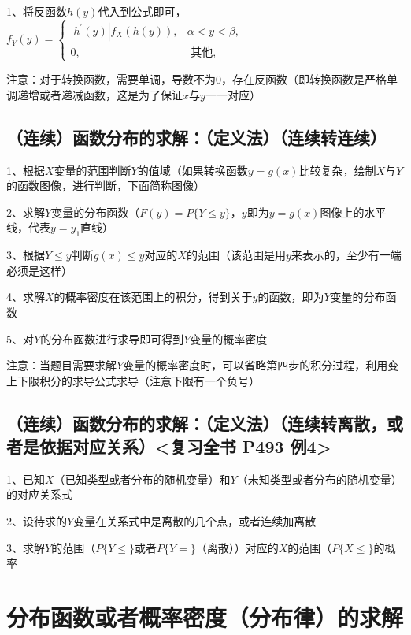 1、将反函数$h(y)$代入到公式即可，$f_{Y}(y)=\left\{\begin{array}{cc}\left|h^{\prime}(y)\right| f_{X}(h(y)), & \alpha<y<\beta, \\0, & \text { 其他, }\end{array}\right.$

注意：对于转换函数，需要单调，导数不为0，存在反函数（即转换函数是严格单调递增或者递减函数，这是为了保证$x$与$y$一一对应）



\subsection{（连续）函数分布的求解：（定义法）（连续转连续）}

1、根据$X$变量的范围判断$Y$的值域（如果转换函数$y=g(x)$比较复杂，绘制$X$与$Y$的函数图像，进行判断，下面简称图像）

2、求解$Y$变量的分布函数（$F(y)=P\{ Y \leqslant y \}$，$y$即为$y=g(x)$图像上的水平线，代表$y=y_1$直线）

3、根据$Y\leqslant y$判断$g(x) \leqslant y$对应的$X$的范围（该范围是用$y$来表示的，至少有一端必须是这样）

4、求解$X$的概率密度在该范围上的积分，得到关于$y$的函数，即为$Y$变量的分布函数

5、对$Y$的分布函数进行求导即可得到$Y$变量的概率密度

注意：当题目需要求解$Y$变量的概率密度时，可以省略第四步的积分过程，利用变上下限积分的求导公式求导（注意下限有一个负号）



\subsection{（连续）函数分布的求解：（定义法）（连续转离散，或者是依据对应关系）<复习全书 P493 例4>}

1、已知$X$（已知类型或者分布的随机变量）和$Y$（未知类型或者分布的随机变量）的对应关系式

2、设待求的$Y$变量在关系式中是离散的几个点，或者连续加离散

3、求解$Y$的范围（$P\{Y \leqslant  \}$或者$P\{Y = \}$（离散））对应的$X$的范围（$P\{X\leqslant \}$的概率

\section{分布函数或者概率密度（分布律）的求解}



